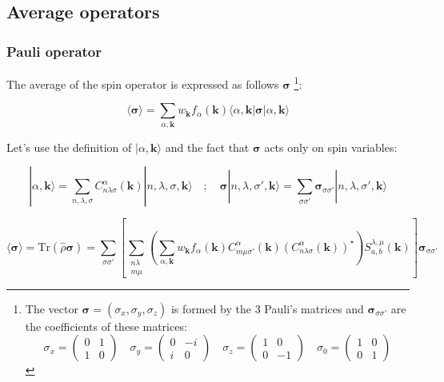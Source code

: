 \documentclass{article}
\newcommand{\bra}[1]{\langle #1|}
\newcommand{\ket}[1]{|#1\rangle}
\newcommand{\op}[1]{\hat{#1}}
\begin{document}
\subsection{Average operators}


\subsubsection{Pauli operator}

\noindent
The average of the spin operator is expressed as follows
$\bm{\sigma}$
\footnote{\noindent 
The vector ${\bm{\sigma}}=(\sigma_x,\sigma_y,\sigma_z)$ is formed by the 3 Pauli's matrices and $\bm{\sigma}_{\sigma \sigma'}$ are the coefficients of these matrices:
\[ \sigma_x=\left( \begin{array}{cc} 0 & 1 \\ 1 & 0 \end{array} \right) 
\quad
\sigma_y=\left( \begin{array}{cc} 0 & -i \\ i & 0 \end{array} \right) \quad
\sigma_z=\left( \begin{array}{cc} 1 & 0 \\ 0 & -1 \end{array} \right) \quad
\sigma_0=\left( \begin{array}{cc} 1 & 0 \\ 0 & 1 \end{array}\right) \]}: 

\[ \langle \bm{\sigma}\rangle= \sum_{\alpha,\mathbf{k}}
w_{\mathbf{k}}f_{\alpha}(\mathbf{k}) \bra{\alpha,\mathbf{k}}\bm{\sigma}\ket{\alpha,\mathbf{k}}\]

\noindent
Let's use the definition of $|\alpha,\mathbf{k}\rangle$ and the fact that $\bm{\sigma}$ acts only on spin variables:

\[ \displaystyle \ket{\alpha , \mathbf{k}}= 
\sum_{n,\lambda, \sigma} C_{n \lambda \sigma}^{\alpha}(\mathbf{k}) \ket{n,\lambda, \sigma, \mathbf{k}}
\quad ; \quad 
\bm{\sigma}\ket{n,\lambda, \sigma', \mathbf{k}}=
\sum_{\sigma \sigma'} \bm{\sigma}_{\sigma \sigma'} \ket{n,\lambda, \sigma', \mathbf{k}}
\]


\[ \langle \bm{\sigma}\rangle=\text{Tr}(\op{\rho} \bm{\sigma})= 
\sum_{\sigma \sigma'} \left[ 
\sum_{\substack{n \lambda\\ m \mu}}
\left( \sum_{\alpha,\mathbf{k}} w_{\mathbf{k}} f_{\alpha}(\mathbf{k}) 
C_{m\mu \sigma'}^{\alpha}(\mathbf{k})(C_{n \lambda \sigma}^{\alpha}(\mathbf{k}))^{\star} \right)
S_{a,b}^{\lambda,\mu}(\mathbf{k}) \right] \bm{\sigma}_{\sigma \sigma'} \]
\end{document}
